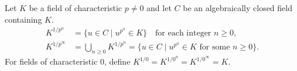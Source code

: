 Let $K$ be a field of characteristic $p \neq 0$ and let $C$ be an algebraically closed field containing $K$.
\begin{align*}
K^{1/p^n} &= \{u \in C \mid u^{p^n} \in K\} \quad \text{for each integer } n \geq 0, \\[4pt]
K^{1/p^\infty} &= \bigcup_{n \geq 0} K^{1/p^n} = \{u \in C \mid u^{p^n} \in K \text{ for some } n \geq 0\}.
\end{align*}
For fields of characteristic $0$, define $K^{1/0} = K^{1/0^n} = K^{1/0^\infty} = K$.
